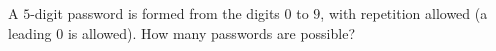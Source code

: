A $5$-digit password is formed from the digits $0$ to $9$, with repetition allowed (a leading $0$ is allowed). How many passwords are possible?
